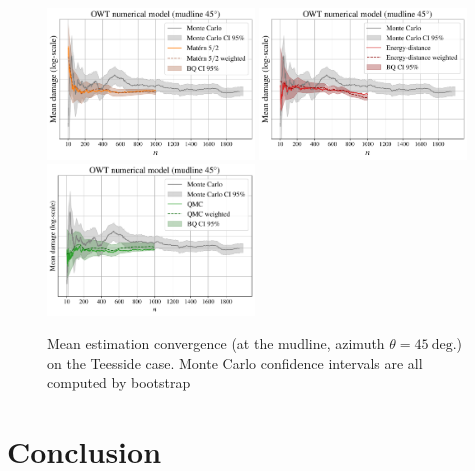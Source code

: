 \begin{figure}[!h]
\begin{center}
    \includegraphics[width=0.49\textwidth]{part2/figures/DCE/teesside/log_convergence_MaternNode1_45.pdf}
    \includegraphics[width=0.49\textwidth]{part2/figures/DCE/teesside/log_convergence_EnergyNode1_45.pdf}
    \includegraphics[width=0.49\textwidth]{part2/figures/DCE/teesside/log_convergence_QMCNode1_45.pdf}
\end{center}
\caption{Mean estimation convergence (at the mudline, azimuth $\theta=45~\mathrm{deg.}$) on the Teesside case. Monte Carlo confidence intervals are all computed by bootstrap} 
\label{fig:convergence_teesside}
\end{figure}


\section{Conclusion}\label{sec:sec45}

